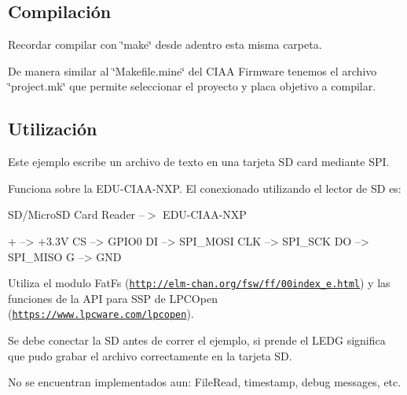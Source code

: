 \subsection*{Compilación}

Recordar compilar con \char`\"{}make\char`\"{} desde adentro esta misma carpeta.

De manera similar al \char`\"{}\+Makefile.\+mine\char`\"{} del C\+I\+AA Firmware tenemos el archivo \char`\"{}project.\+mk\char`\"{} que permite seleccionar el proyecto y placa objetivo a compilar.

\subsection*{Utilización}

Este ejemplo escribe un archivo de texto en una tarjeta SD card mediante S\+PI.

Funciona sobre la E\+D\+U-\/\+C\+I\+A\+A-\/\+N\+XP. El conexionado utilizando el lector de SD es\+:

S\+D/\+Micro\+SD Card Reader --$>$ E\+D\+U-\/\+C\+I\+A\+A-\/\+N\+XP \begin{DoxyVerb}                 + --> +3.3V
                CS --> GPIO0
                DI --> SPI_MOSI
               CLK --> SPI_SCK
                DO --> SPI_MISO
                 G --> GND
\end{DoxyVerb}


Utiliza el modulo Fat\+Fs (\href{http://elm-chan.org/fsw/ff/00index_e.html}{\tt http\+://elm-\/chan.\+org/fsw/ff/00index\+\_\+e.\+html}) y las funciones de la A\+PI para S\+SP de L\+P\+C\+Open (\href{https://www.lpcware.com/lpcopen}{\tt https\+://www.\+lpcware.\+com/lpcopen}).

Se debe conectar la SD antes de correr el ejemplo, si prende el L\+E\+DG significa que pudo grabar el archivo correctamente en la tarjeta SD.

No se encuentran implementados aun\+: File\+Read, timestamp, debug messages, etc. 